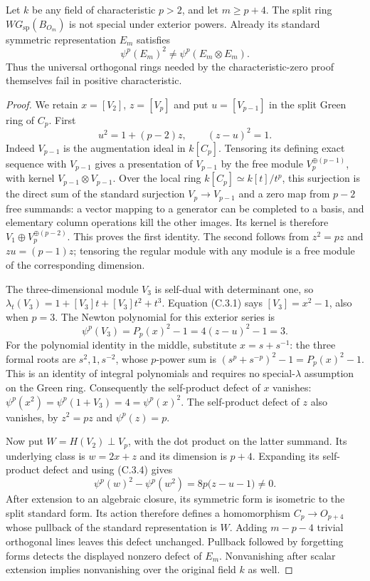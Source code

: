\begin{corollary}
\label{C:BO_positive_failure}
Let $k$ be any field of characteristic $p>2$, and let $m\geq p+4$.
The split ring $WG_{\mathrm{sp}}(B_{O_m})$ is not special under exterior
powers. Already its standard symmetric representation $E_m$ satisfies
\[
 \psi^p(E_m)^2\ne\psi^p(E_m\otimes E_m).
\]
Thus the universal orthogonal rings needed by the characteristic-zero
proof themselves fail in positive characteristic.
\end{corollary}
\begin{proof}
We retain $x=[V_2]$, $z=[V_p]$ and put $u=[V_{p-1}]$ in the split Green
ring of $C_p$. First
\[
 u^2=1+(p-2)z,\qquad (z-u)^2=1.                         \tag{C.3.7}
\]
Indeed $V_{p-1}$ is the augmentation ideal in $k[C_p]$. Tensoring its
defining exact sequence with $V_{p-1}$ gives a presentation of
$V_{p-1}$ by the free module $V_p^{\oplus(p-1)}$, with kernel
$V_{p-1}\otimes V_{p-1}$. Over the local ring $k[C_p]\simeq k[t]/t^p$,
this surjection is the direct sum of the standard surjection
$V_p\to V_{p-1}$ and a zero map from $p-2$ free summands: a vector
mapping to a generator can be completed to a basis, and elementary column
operations kill the other images. Its kernel is therefore
$V_1\oplus V_p^{\oplus(p-2)}$. This proves the first identity.
The second follows from $z^2=pz$ and $zu=(p-1)z$; tensoring the regular
module with any module is a free module of the corresponding dimension.

The three-dimensional module $V_3$ is self-dual with determinant one, so
$\lambda_t(V_3)=1+[V_3]t+[V_3]t^2+t^3$. Equation (C.3.1) says
$[V_3]=x^2-1$, also when $p=3$. The Newton polynomial for this exterior
series is
\[
 \psi^p(V_3)=P_p(x)^2-1=4(z-u)^2-1=3.
\]
For the polynomial identity in the middle, substitute $x=s+s^{-1}$:
the three formal roots are $s^2,1,s^{-2}$, whose $p$-power sum is
$(s^p+s^{-p})^2-1=P_p(x)^2-1$. This is an identity of integral
polynomials and requires no special-$\lambda$ assumption on the Green
ring. Consequently the self-product defect of $x$ vanishes:
$\psi^p(x^2)=\psi^p(1+V_3)=4=\psi^p(x)^2$.
The self-product defect of $z$ also vanishes, by $z^2=pz$ and
$\psi^p(z)=p$.

Now put $W=H(V_2)\perp V_p$, with the dot product on the latter summand.
Its underlying class is $w=2x+z$ and its dimension is $p+4$.
Expanding its self-product defect and using (C.3.4) gives
\[
 \psi^p(w)^2-\psi^p(w^2)
       =8p\bigl(z-u-1\bigr)\ne0.                     \tag{C.3.8}
\]
After extension to an algebraic closure, its symmetric form is isometric
to the split standard form. Its action therefore defines a homomorphism
$C_p\to O_{p+4}$ whose pullback of the standard representation is $W$.
Adding $m-p-4$ trivial orthogonal lines leaves this defect unchanged.
Pullback followed by forgetting forms detects the displayed nonzero
defect of $E_m$. Nonvanishing after scalar extension implies nonvanishing
over the original field $k$ as well.


\end{proof}

